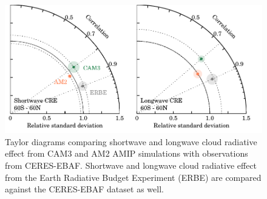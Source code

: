 \begin{figure}
    \centering
    \includegraphics{../graphics/cre_cmip3amip_taylor.pdf}
    \caption[Taylor diagrams comparing shortwave and longwave cloud radiative effect from CAM3 and AM2 AMIP simulations with observations from CERES-EBAF.]{Taylor diagrams comparing shortwave and longwave cloud radiative effect from CAM3 and AM2 AMIP simulations with observations from CERES-EBAF. Shortwave and longwave cloud radiative effect from the Earth Radiative Budget Experiment (ERBE) \citep{harrison_et_al_1990} are compared against the CERES-EBAF dataset as well.}
    \label{cre_cmip3amip_taylor}
\end{figure}
    
